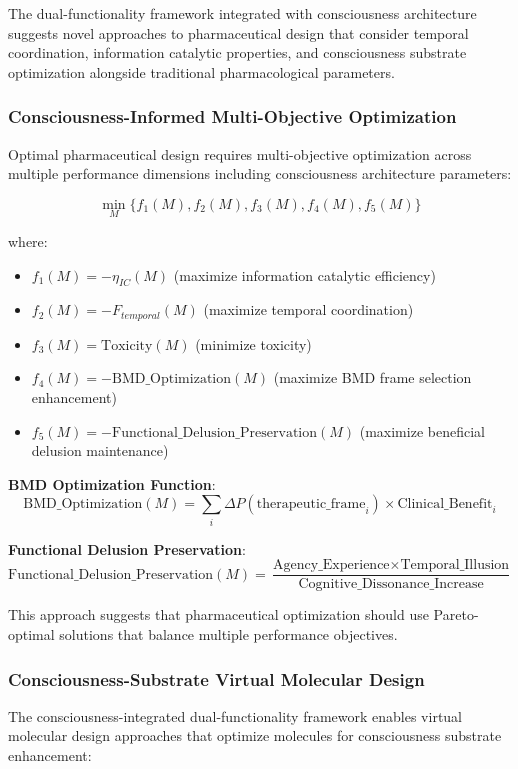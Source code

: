 \documentclass[12pt,a4paper]{article}
\begin{document}
The dual-functionality framework integrated with consciousness architecture suggests novel approaches to pharmaceutical design that consider temporal coordination, information catalytic properties, and consciousness substrate optimization alongside traditional pharmacological parameters.

\subsubsection{Consciousness-Informed Multi-Objective Optimization}

Optimal pharmaceutical design requires multi-objective optimization across multiple performance dimensions including consciousness architecture parameters:

$$\min_{M} \{f_1(M), f_2(M), f_3(M), f_4(M), f_5(M)\}$$

where:
\begin{itemize}
\item $f_1(M) = -\eta_{IC}(M)$ (maximize information catalytic efficiency)
\item $f_2(M) = -F_{temporal}(M)$ (maximize temporal coordination)
\item $f_3(M) = \text{Toxicity}(M)$ (minimize toxicity)
\item $f_4(M) = -\text{BMD\_Optimization}(M)$ (maximize BMD frame selection enhancement)
\item $f_5(M) = -\text{Functional\_Delusion\_Preservation}(M)$ (maximize beneficial delusion maintenance)
\end{itemize}

\textbf{BMD Optimization Function}:
$$\text{BMD\_Optimization}(M) = \sum_{i} \Delta P(\text{therapeutic\_frame}_i) \times \text{Clinical\_Benefit}_i$$

\textbf{Functional Delusion Preservation}:
$$\text{Functional\_Delusion\_Preservation}(M) = \frac{\text{Agency\_Experience} \times \text{Temporal\_Illusion}}{\text{Cognitive\_Dissonance\_Increase}}$$

This approach suggests that pharmaceutical optimization should use Pareto-optimal solutions that balance multiple performance objectives.

\subsubsection{Consciousness-Substrate Virtual Molecular Design}

The consciousness-integrated dual-functionality framework enables virtual molecular design approaches that optimize molecules for consciousness substrate enhancement:
\end{document}
